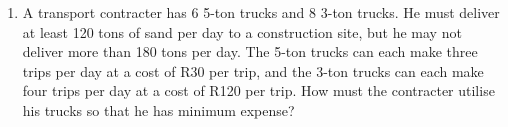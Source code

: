 \begin{enumerate}
\item{A transport contracter has 6 5-ton trucks and 8 3-ton trucks.  He must deliver at least 120 tons of sand per day to a construction site, but he may not deliver more than 180 tons per day. The 5-ton trucks can each make three trips per day at a cost of R30 per trip, and the 3-ton trucks can each make four trips per day at a cost of R120 per trip.  How must the contracter utilise his trucks so that he has minimum expense?}

\end{enumerate}








